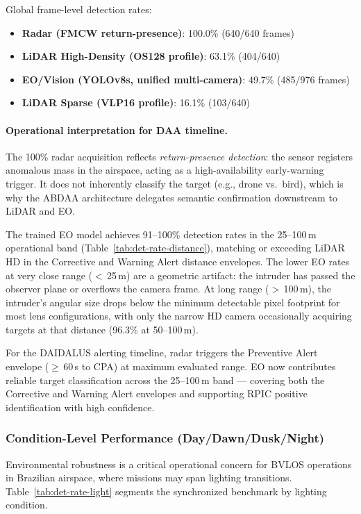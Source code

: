 \noindent Global frame-level detection rates:
\begin{itemize}
  \item \textbf{Radar (FMCW return-presence)}: 100.0\% (640/640 frames)
  \item \textbf{LiDAR High-Density (OS128 profile)}: 63.1\% (404/640)
  \item \textbf{EO/Vision (YOLOv8s, unified multi-camera)}: 49.7\% (485/976 frames)
  \item \textbf{LiDAR Sparse (VLP16 profile)}: 16.1\% (103/640)
\end{itemize}

\paragraph{Operational interpretation for DAA timeline.}
The 100\% radar acquisition reflects \emph{return-presence detection}: the sensor registers anomalous mass in the airspace, acting as a high-availability early-warning trigger. It does not inherently classify the target (e.g., drone vs.\ bird), which is why the ABDAA architecture delegates semantic confirmation downstream to LiDAR and EO.

The trained EO model achieves 91--100\% detection rates in the 25--100\,m operational band (Table~\ref{tab:det-rate-distance}), matching or exceeding LiDAR HD in the Corrective and Warning Alert distance envelopes. The lower EO rates at very close range ($<$\,25\,m) are a geometric artifact: the intruder has passed the observer plane or overflows the camera frame. At long range ($>$\,100\,m), the intruder's angular size drops below the minimum detectable pixel footprint for most lens configurations, with only the narrow HD camera occasionally acquiring targets at that distance (96.3\% at 50--100\,m).

For the DAIDALUS alerting timeline, radar triggers the Preventive Alert envelope ($\geq$\,60\,s to CPA) at maximum evaluated range. EO now contributes reliable target classification across the 25--100\,m band --- covering both the Corrective and Warning Alert envelopes and supporting RPIC positive identification with high confidence.

\subsubsection{Condition-Level Performance (Day/Dawn/Dusk/Night)}

Environmental robustness is a critical operational concern for BVLOS operations in Brazilian airspace, where missions may span lighting transitions. Table~\ref{tab:det-rate-light} segments the synchronized benchmark by lighting condition.

